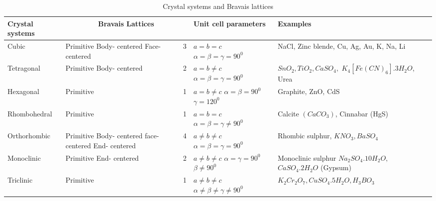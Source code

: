 \begin{table}[H]
	\renewcommand*{\arraystretch}{1.5}
	\begin{tabular}{|p{3 cm}|p{3 cm}|p{1 cm}|p{3.5cm}|p{5cm}| }
		\hline
		
		Crystal systems&\multicolumn{2}{|c|}{Bravais Lattices}& Unit cell parameters& Examples \\\hline 
		Cubic & Primitive \newline Body- centered \newline Face- centered &3& $a=b=c$ \newline $\alpha = \beta = \gamma = 90^{0}$ & NaCl, Zinc blende, Cu, Ag, Au, K, Na, Li \\ \hline 
		Tetragonal & Primitive \newline Body- centered & 2&$a=b \neq c$ \newline $\alpha = \beta = \gamma = 90^{0}$ & $SnO_{2}, TiO_{2}, CaSO_{4},$ \newline  $K_{4}[Fe(CN)_{6}].3H_{2}O$, Urea\\ \hline
		Hexagonal & Primitive &1& $a=b \neq c$ \newline $\alpha = \beta =  90^{0}$ \newline $\gamma = 120^{0}$ & Graphite, ZnO, CdS\\ \hline
		Rhombohedral & Primitive & 1&$a=b = c$ \newline $\alpha = \beta = \gamma \neq 90^{0}$& Calcite $(CaCO_{3})$, Cinnabar (HgS)\\ \hline
		Orthorhombic & Primitive \newline Body- centered \newline face- centered \newline End- centered &4& $a \neq b \neq c$ \newline $\alpha = \beta = \gamma = 90^{0}$& Rhombic sulphur, $KNO_{3}, BaSO_{4}$\\ \hline
		Monoclinic & Primitive   \newline End- centered &2& $a \neq b \neq c$ \newline $\alpha  = \gamma = 90^{0}$ \newline $ \beta \neq 90^{0} $ & {Monoclinic sulphur} $Na_{2}SO_{4}.10H_{2}O,$   $CaSO_{4}.2H_{2}O$ (Gypsum)\\ \hline
		Triclinic & Primitive&1 \multirow{1}{2cm}{14}& $a \neq b \neq c$ \newline $\alpha  \neq \beta \neq \gamma \neq 90^{0} $  & $K_{2}Cr_{2}O_{7}, CuSO_{4}.5H_{2}O, H_{3}BO_{3}$\\ \hline
	\end{tabular}
	\label{1}
	\caption{Crystal systems and Bravais lattices}
\end{table}

